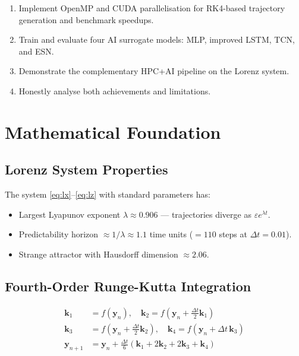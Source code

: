 \documentclass[11pt,a4paper]{article}
\begin{document}
\begin{enumerate}
  \item Implement OpenMP and CUDA parallelisation for RK4-based trajectory generation
        and benchmark speedups.
  \item Train and evaluate four AI surrogate models: MLP, improved LSTM, TCN, and ESN.
  \item Demonstrate the complementary HPC+AI pipeline on the Lorenz system.
  \item Honestly analyse both achievements and limitations.
\end{enumerate}


\section{Mathematical Foundation}

\subsection{Lorenz System Properties}

The system \eqref{eq:lx}--\eqref{eq:lz} with standard parameters has:
\begin{itemize}
  \item Largest Lyapunov exponent $\lambda \approx 0.906$ --- trajectories diverge
        as $\varepsilon e^{\lambda t}$.
  \item Predictability horizon $\approx 1/\lambda \approx 1.1$ time units
        ($= 110$ steps at $\Delta t=0.01$).
  \item Strange attractor with Hausdorff dimension $\approx 2.06$.
\end{itemize}

\subsection{Fourth-Order Runge-Kutta Integration}

\begin{align}
  \mathbf{k}_1 &= f(\mathbf{y}_n), \quad
  \mathbf{k}_2 = f\!\left(\mathbf{y}_n + \tfrac{\Delta t}{2}\mathbf{k}_1\right)\\
  \mathbf{k}_3 &= f\!\left(\mathbf{y}_n + \tfrac{\Delta t}{2}\mathbf{k}_2\right),
  \quad \mathbf{k}_4 = f(\mathbf{y}_n + \Delta t\,\mathbf{k}_3)\\
  \mathbf{y}_{n+1} &= \mathbf{y}_n +
      \frac{\Delta t}{6}(\mathbf{k}_1 + 2\mathbf{k}_2 + 2\mathbf{k}_3 + \mathbf{k}_4)
\end{align}
\end{document}
